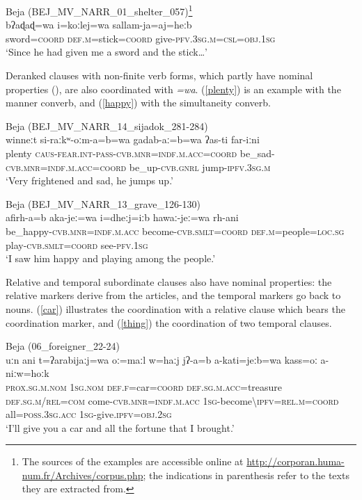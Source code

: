 \documentclass[output=paper]{langsci/langscibook}
\begin{document}
\ea \label{sword}
{Beja (BEJ\_MV\_NARR\_01\_shelter\_057)\footnote{The sources of the examples are accessible online at \url{http://corporan.huma-num.fr/Archives/corpus.php}; the indications in parenthesis refer to the texts they are extracted from.}}\\
\gll bʔaɖaɖ=wa i=koːlej=wa sallam-ja=aj=heːb\\
     sword=\textsc{coord} \textsc{def.m}=stick=\textsc{coord} give-\textsc{pfv.3sg.m=csl=obj.1sg}\\
\glt `Since he had given me a sword and the stick…'
\z

Deranked clauses with non-finite verb forms, which partly have nominal properties (\citealt{Vanhove2016}), are also coordinated with \textit{=wa}. (\ref{plenty}) is an example with the manner converb, and (\ref{happy}) with the simultaneity converb. 

\ea\label{plenty}
{Beja (BEJ\_MV\_NARR\_14\_sijadok\_281-284)}\\
\gll winneːt si-raːkʷ-oːm-a=b=wa gadab-aː=b=wa  ʔas-ti far-iːni\\
     plenty \textsc{caus}{}-\textsc{\textup{fear}}.\textsc{int-pass-cvb.mnr=indf.m.acc=coord} be\_sad-\textsc{cvb.mnr=indf.m.acc=coord} be\_up-\textsc{cvb.gnrl} jump-\textsc{ipfv.3sg.m}\\
\glt `Very frightened and sad, he jumps up.'
\z

\ea\label{happy}
{Beja (BEJ\_MV\_NARR\_13\_grave\_126-130)}\\
\gll afirh-a=b aka-jeː=wa i=dheːj=iːb hawaː-jeː=wa rh-ani\\
     be\_happy-\textsc{cvb.mnr=indf.m.acc} become-\textsc{cvb.smlt=coord} \textsc{def.m}=people=\textsc{loc.sg} play-\textsc{cvb.smlt=coord} see-\textsc{pfv.1sg}\\
\glt `I saw him happy and playing among the people.'
\z

{Relative and temporal subordinate clauses also have nominal properties: the relative markers derive from the articles, and the temporal markers go back to nouns. (\ref{car}) illustrates the coordination with a relative clause which bears the} {coordination marker, and (\ref{thing}) the coordination of two temporal clauses.}

\ea\label{car}
{{Beja}{ (}{06\_foreigner\_22-24)}}\\
\gll uːn ani t=ʔarabijaːj=wa oː=maːl w=haːj jʔ-a=b a-kati=jeːb=wa kass=oː  a-niːw=hoːk\\
     \textsc{prox.sg.m.nom}	\textsc{1sg.nom} \textsc{def.f=}car=\textsc{coord} \textsc{def.sg.m.acc=}treasure \textsc{def.sg.m/rel=com} come-\textsc{cvb.mnr=indf.m.acc} \textsc{1sg}-become\textsc{\textbackslash ipfv=rel.m=coord} all=\textsc{poss.3sg.acc} \textsc{1sg}-give.\textsc{ipfv=obj.2sg}\\
\glt `I’ll give you a car and all the fortune that I brought.'
\z
\end{document}
